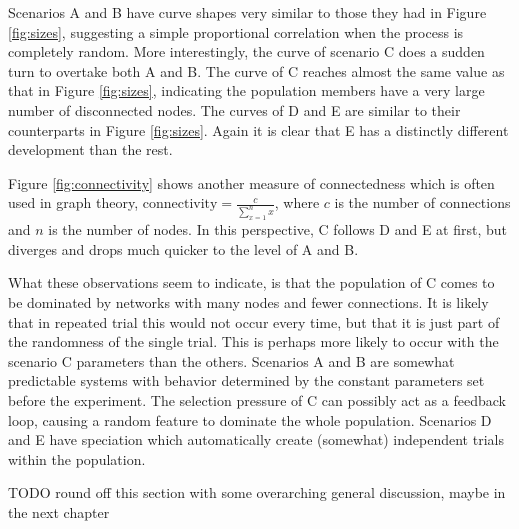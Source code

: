 Scenarios A and B have curve shapes very similar to those they had in Figure \ref{fig:sizes}, suggesting a simple proportional correlation when the process is completely random.
More interestingly, the curve of scenario C does a sudden turn to overtake both A and B.
The curve of C reaches almost the same value as that in Figure \ref{fig:sizes}, indicating the population members have a very large number of disconnected nodes.
The curves of D and E are similar to their counterparts in Figure \ref{fig:sizes}.
Again it is clear that E has a distinctly different development than the rest.


Figure \ref{fig:connectivity} shows another measure of connectedness which is often used in graph theory, $\text{connectivity} = \frac{c}{\sum_{x=1}^{n}{x}}$, where $c$ is the number of connections and $n$ is the number of nodes.
In this perspective, C follows D and E at first, but diverges and drops much quicker to the level of A and B.

What these observations seem to indicate, is that the population of C comes to be dominated by networks with many nodes and fewer connections.
It is likely that in repeated trial this would not occur every time, but that it is just part of the randomness of the single trial.
This is perhaps more likely to occur with the scenario C parameters than the others.
Scenarios A and B are somewhat predictable systems with behavior determined by the constant parameters set before the experiment.
The selection pressure of C can possibly act as a feedback loop, causing a random feature to dominate the whole population.
Scenarios D and E have speciation which automatically create (somewhat) independent trials within the population.

TODO round off this section with some overarching general discussion, maybe in the next chapter
